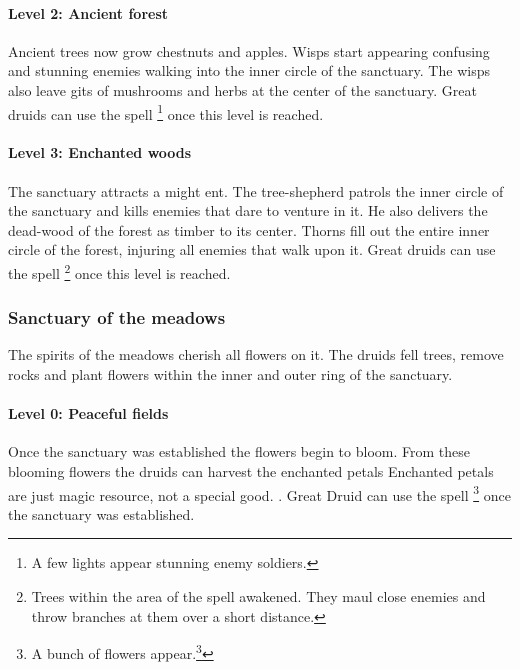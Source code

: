 \documentclass[a4paper]{book}
\begin{document}
			\paragraph{Level 2: Ancient forest}
				Ancient trees now grow chestnuts and apples.
				Wisps start appearing confusing and stunning enemies walking into the inner circle
				of the sanctuary.
				The wisps also leave gits of mushrooms and herbs at the center of the sanctuary.
				Great druids can use the spell \footnote{
					A few lights appear stunning enemy soldiers.
				} once this level is reached.

			\paragraph{Level 3: Enchanted woods}
				The sanctuary attracts a might ent.
				The tree-shepherd patrols the inner circle of the sanctuary
				and kills enemies that dare to venture in it.
				He also delivers the dead-wood of the forest as timber to its center.
				Thorns fill out the entire inner circle of the forest,
				injuring all enemies that walk upon it.
				Great druids can use the spell \footnote{
				Trees within the area of the spell awakened.
				They maul close enemies and throw branches at them over a short distance.
				} once this level is reached.

		\subsubsection{Sanctuary of the meadows}
			The spirits of the meadows cherish all flowers on it.
			The druids fell trees, remove rocks and plant flowers
			within the inner and outer ring of the sanctuary.

			\paragraph{Level 0: Peaceful fields}
				Once the sanctuary was established the flowers begin to bloom.
				From these blooming flowers the druids can harvest the enchanted petals{
					Enchanted petals are just magic resource, not a special good.
				}.
				Great Druid can use the spell \footnote{
					A bunch of flowers appear.\footnote{
						Since this is the only way besides the sanctuary to create flowers
						it is a convenient way to either level it up faster or
						get a mead production going.
					}
				} once the sanctuary was established.
\end{document}
